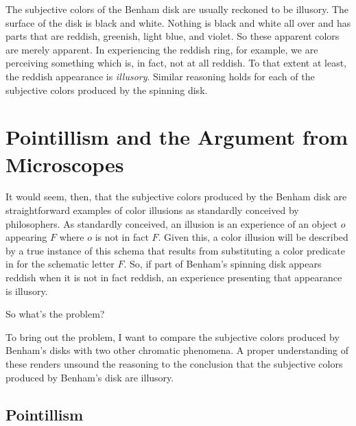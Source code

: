 \documentclass[12pt]{article}
\begin{document}
The subjective colors of the Benham disk are usually reckoned to be illusory. The surface of the disk is black and white. Nothing is black and white all over and has parts that are reddish, greenish, light blue, and violet. So these apparent colors are merely apparent. In experiencing the reddish ring, for example, we are perceiving something which is, in fact, not at all reddish. To that extent at least, the reddish appearance is \emph{illusory}. Similar reasoning holds for each of the subjective colors produced by the spinning disk.

\section{Pointillism and the Argument from Microscopes}\label{sec:pointillism_and_the_argument_from_microscopes} %

It would seem, then, that the subjective colors produced by the Benham disk are straightforward examples of color illusions as standardly conceived by philosophers. As standardly conceived, an illusion is an experience of an object \( o \) appearing \( F \) where \( o \) is not in fact \( F \). Given this, a color illusion will be described by a true instance of this schema that results from substituting a color predicate in for the schematic letter \( F \). So, if part of Benham's spinning disk appears reddish when it is not in fact reddish, an experience presenting that appearance is illusory. 

So what's the problem?

To bring out the problem, I want to compare the subjective colors produced by Benham's disks with two other chromatic phenomena. A proper understanding of these renders unsound the reasoning to the conclusion that the subjective colors produced by Benham's disk are illusory.


\subsection{Pointillism}\label{sub:pointillism} %
\end{document}
